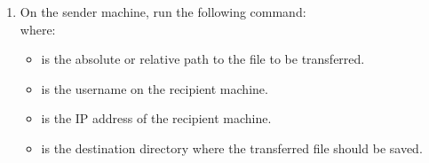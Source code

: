 \begin{enumerate}[label=(\arabic*)]
\begin{enumerate}
            \item On the sender machine, run the following command:
                  \\
                  where:
                  \begin{itemize}
                      \item {} is the absolute or relative path to
                      the file to be transferred.
                      \item {} is the username on the recipient
                      machine.
                      \item {} is the IP address of the
                      recipient machine.
                      \item {} is the destination directory
                      where the transferred file should be saved.
                  \end{itemize}
          \end{enumerate}
\end{enumerate}
